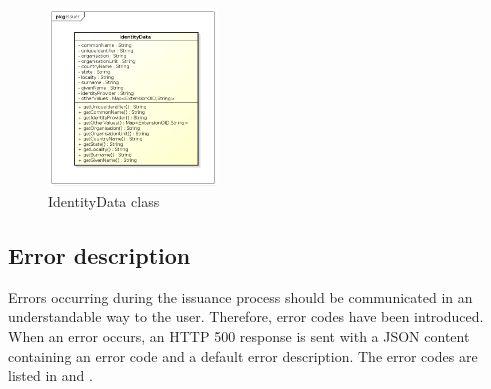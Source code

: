 \documentclass[oneside]{scrreprt}
\begin{document}
\begin{figure}[ht]
\centerline{
\includegraphics[width=0.4\textwidth]{figs/IdentityData_class.png}}
\caption{IdentityData class}
\label{fig:identity_data}
\end{figure}

\subsection{Error description}

Errors occurring during the issuance process should be communicated in an understandable way to the user. Therefore, error codes have been introduced. When an error occurs, an HTTP 500 response is sent with a JSON content containing an error code and a default error description. The error codes are listed in  and .
\end{document}
